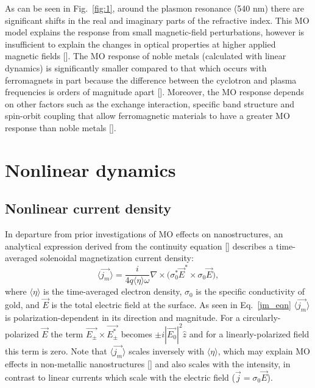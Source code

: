 As can be seen in Fig.~\ref{fig:1}, around the plasmon resonance (540 nm) there are significant shifts in the real and imaginary parts of the refractive index. This MO model explains the response from small magnetic-field perturbations, however is insufficient to explain the changes in optical properties at higher applied magnetic fields [\cite{Singh}]. The MO response of noble metals (calculated with linear dynamics) is significantly smaller compared to that which occurs with ferromagnets in part because the difference between the cyclotron and plasma frequencies is orders of magnitude apart [\cite{Schnatterly}]. Moreover, the MO response depends on other factors such as the exchange interaction, specific band structure and spin-orbit coupling that allow ferromagnetic materials to have a greater MO response than noble metals [\cite{Armelles2}].  
\section{Nonlinear dynamics}
\subsection{Nonlinear current density}
In departure from prior investigations of MO effects on nanostructures, an analytical expression derived from the continuity equation [\cite{Hertel}] describes a time-averaged solenoidal magnetization current density:
\begin{equation}
\langle \vec{j_m} \rangle = \frac{i}{4q\langle \eta\rangle \omega}\nabla \times\big(\sigma_0^*\vec{E}^*\times\sigma_0\vec{E}\big),
\label{jm_eqn}
\end{equation}
where $\langle \eta\rangle$ is the time-averaged electron density, $\sigma_0$ is the specific conductivity of gold, and $\vec{E}$ is the total electric field at the surface. As seen in Eq.~\ref{jm_eqn} $\langle\vec{j_m}\rangle$ is polarization-dependent in its direction and magnitude. For a circularly-polarized $\vec{E}$ the term $\vec{E_{\pm}}\times\vec{E_{\pm}^*}$ becomes $\pm i |\vec{E_0}|^2\hat{z}$ and for a linearly-polarized field this term is zero. Note that $\langle\vec{j_m}\rangle$ scales inversely with $\langle \eta\rangle$, which may explain MO effects in non-metallic nanostructures [\cite{Kuznetsov}] and also scales with the intensity, in contrast to linear currents which scale with the electric field ($\vec{j}=\sigma_0\vec{E}$). 
